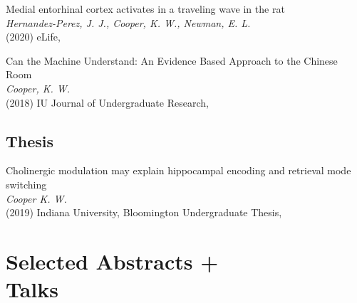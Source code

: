 \documentclass[10pt]{cooperCV2}
\begin{document}
\begin{etaremune}[resume,itemindent=-\bibhang, topsep=0pt,
				   itemsep=\bibsep,partopsep=0pt,parsep=0pt,leftmargin={\bibhang+\widthof{[999]}}]
	
    \item Medial entorhinal cortex activates in a traveling wave in the rat \\
     \textit{Hernandez-Perez, J. J., Cooper, K. W., Newman, E. L.}\\
     (2020) eLife, 
     
	
    \item Can the Machine Understand: An Evidence Based Approach to the Chinese Room \\
     \textit{Cooper, K. W.}\\
     (2018) IU Journal of Undergraduate Research, 
     
	

\end{etaremune}

 

	

\subsection{Thesis} 
\begin{etaremune}[resume,itemindent=-\bibhang, topsep=0pt,
				   itemsep=\bibsep,partopsep=0pt,parsep=0pt,leftmargin={\bibhang+\widthof{[999]}}] 
    
    \item Cholinergic modulation may explain hippocampal encoding and retrieval mode switching \\
     \textit{Cooper K. W.}\\
     (2019) Indiana University, Bloomington Undergraduate Thesis, 
     
	

\end{etaremune}





















\section{Selected Abstracts +  \\Talks}
\end{document}
